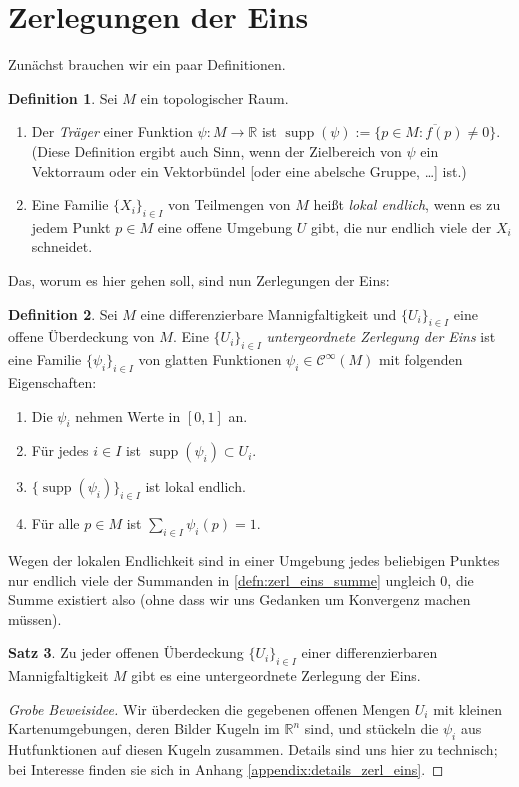 \documentclass[a4paper]{scrbook}
\numberwithin{equation}{chapter}
\DeclareMathOperator{\supp}{supp}
\newcommand{\R}{\mathbb{R}}
\newcommand{\sC}{\mathcal{C}^{\infty}}
\theoremstyle{definition}
\newtheorem{defn}{Definition}[section]
\newtheorem{satz}[defn]{Satz}
\begin{document}
\section{Zerlegungen der Eins}
Zunächst brauchen wir ein paar Definitionen.
\begin{defn}
	Sei $M$ ein topologischer Raum.
	\begin{enumerate}[label=(\alph*)]
		\item Der \emph{Träger} einer Funktion $\psi\colon M \to \R$ ist $\supp(\psi) := \overline{\{p \in M \colon f(p) \ne 0\}}$. (Diese Definition ergibt auch Sinn, wenn der Zielbereich von $\psi$ ein Vektorraum oder ein Vektorbündel [oder eine abelsche Gruppe, \dots] ist.)
		\item Eine Familie $\{X_i\}_{i\in I}$ von Teilmengen von $M$ heißt \emph{lokal endlich}, wenn es zu jedem Punkt $p\in M$ eine offene Umgebung $U$ gibt, die nur endlich viele der $X_i$ schneidet.
	\end{enumerate}
\end{defn}
Das, worum es hier gehen soll, sind nun Zerlegungen der Eins:
\begin{defn}
	Sei $M$ eine differenzierbare Mannigfaltigkeit und $\{U_i\}_{i\in I}$ eine offene Überdeckung von $M$. Eine $\{U_i\}_{i\in I}$ \emph{untergeordnete Zerlegung der Eins} ist eine Familie $\{\psi_i\}_{i\in I}$ von glatten Funktionen $\psi_i \in \sC(M)$ mit folgenden Eigenschaften:
	\begin{enumerate}[label=(\roman*)]
		\item Die $\psi_i$ nehmen Werte in $[0,1]$ an.
		\item Für jedes $i\in I$ ist $\supp(\psi_i) \subset U_i$.
		\item $\{\supp(\psi_i)\}_{i\in I}$ ist lokal endlich.
		\item \label{defn:zerl_eins_summe} Für alle $p\in M$ ist $\sum_{i\in I} \psi_i(p) = 1$.
	\end{enumerate}
	Wegen der lokalen Endlichkeit sind in einer Umgebung jedes beliebigen Punktes nur endlich viele der Summanden in \ref{defn:zerl_eins_summe} ungleich 0, die Summe existiert also (ohne dass wir uns Gedanken um Konvergenz machen müssen).
\end{defn}

\begin{satz} \label{satz:zerl_eins}
	Zu jeder offenen Überdeckung $\{U_i\}_{i\in I}$ einer differenzierbaren Mannigfaltigkeit $M$ gibt es eine untergeordnete Zerlegung der Eins.

	\begin{proof}[Grobe Beweisidee]
		Wir überdecken die gegebenen offenen Mengen $U_i$ mit kleinen Kartenumgebungen, deren Bilder Kugeln im $\R^n$ sind, und stückeln die $\psi_i$ aus Hutfunktionen auf diesen Kugeln zusammen. Details sind uns hier zu technisch; bei Interesse finden sie sich in Anhang \ref{appendix:details_zerl_eins}.
	\end{proof}
\end{satz}
\end{document}

